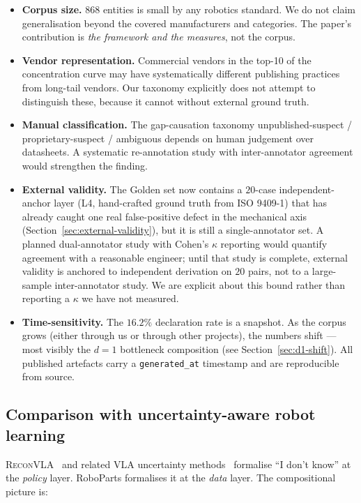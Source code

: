 \documentclass[review]{elsarticle}
\begin{document}
\begin{itemize}[nosep,leftmargin=*]
\item \textbf{Corpus size.} $868$ entities is small by any robotics
standard. We do not claim generalisation beyond the covered
manufacturers and categories. The paper's contribution is
\emph{the framework and the measures}, not the corpus.

\item \textbf{Vendor representation.} Commercial vendors in the top-10
of the concentration curve may have systematically different
publishing practices from long-tail vendors. Our taxonomy explicitly
does not attempt to distinguish these, because it cannot without
external ground truth.

\item \textbf{Manual classification.} The gap-causation taxonomy
unpublished-suspect / proprietary-suspect / ambiguous depends on
human judgement over datasheets. A systematic re-annotation study
with inter-annotator agreement would strengthen the finding.

\item \textbf{External validity.} The Golden set now contains a
$20$-case independent-anchor layer (L4, hand-crafted ground truth
from ISO 9409-1) that has already caught one real false-positive
defect in the mechanical axis (Section~\ref{sec:external-validity}),
but it is still a single-annotator set. A planned dual-annotator
study with Cohen's $\kappa$ reporting would quantify agreement with
a reasonable engineer; until that study is complete, external
validity is anchored to independent derivation on $20$ pairs, not to
a large-sample inter-annotator study. We are explicit about this
bound rather than reporting a $\kappa$ we have not measured.

\item \textbf{Time-sensitivity.} The $16.2\%$ declaration rate is a
snapshot. As the corpus grows (either through us or through other
projects), the numbers shift --- most visibly the $d=1$ bottleneck
composition (see Section~\ref{sec:d1-shift}). All published
artefacts carry a \texttt{generated\_at} timestamp and are
reproducible from source.
\end{itemize}

\subsection{Comparison with uncertainty-aware robot learning}

\textsc{ReconVLA}~\cite{R10} and related VLA uncertainty
methods~\cite{R11} formalise ``I don't know'' at the \emph{policy}
layer. RoboParts formalises it at the \emph{data} layer. The
compositional picture is:
\end{document}
